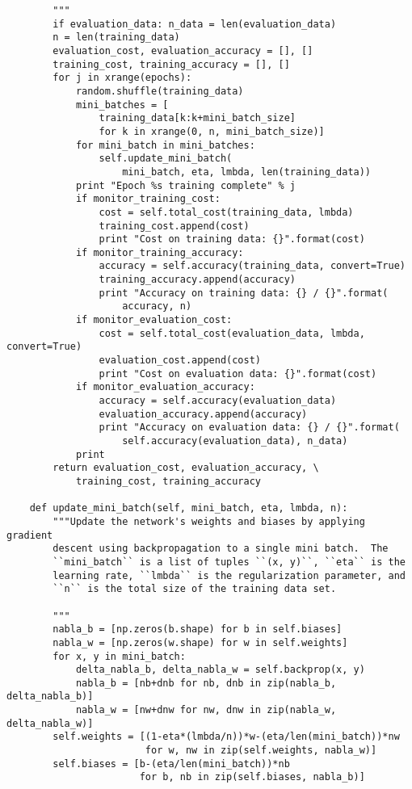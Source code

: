 \begin{lstlisting}
        """
        if evaluation_data: n_data = len(evaluation_data)
        n = len(training_data)
        evaluation_cost, evaluation_accuracy = [], []
        training_cost, training_accuracy = [], []
        for j in xrange(epochs):
            random.shuffle(training_data)
            mini_batches = [
                training_data[k:k+mini_batch_size]
                for k in xrange(0, n, mini_batch_size)]
            for mini_batch in mini_batches:
                self.update_mini_batch(
                    mini_batch, eta, lmbda, len(training_data))
            print "Epoch %s training complete" % j
            if monitor_training_cost:
                cost = self.total_cost(training_data, lmbda)
                training_cost.append(cost)
                print "Cost on training data: {}".format(cost)
            if monitor_training_accuracy:
                accuracy = self.accuracy(training_data, convert=True)
                training_accuracy.append(accuracy)
                print "Accuracy on training data: {} / {}".format(
                    accuracy, n)
            if monitor_evaluation_cost:
                cost = self.total_cost(evaluation_data, lmbda, convert=True)
                evaluation_cost.append(cost)
                print "Cost on evaluation data: {}".format(cost)
            if monitor_evaluation_accuracy:
                accuracy = self.accuracy(evaluation_data)
                evaluation_accuracy.append(accuracy)
                print "Accuracy on evaluation data: {} / {}".format(
                    self.accuracy(evaluation_data), n_data)
            print
        return evaluation_cost, evaluation_accuracy, \
            training_cost, training_accuracy

    def update_mini_batch(self, mini_batch, eta, lmbda, n):
        """Update the network's weights and biases by applying gradient
        descent using backpropagation to a single mini batch.  The
        ``mini_batch`` is a list of tuples ``(x, y)``, ``eta`` is the
        learning rate, ``lmbda`` is the regularization parameter, and
        ``n`` is the total size of the training data set.

        """
        nabla_b = [np.zeros(b.shape) for b in self.biases]
        nabla_w = [np.zeros(w.shape) for w in self.weights]
        for x, y in mini_batch:
            delta_nabla_b, delta_nabla_w = self.backprop(x, y)
            nabla_b = [nb+dnb for nb, dnb in zip(nabla_b, delta_nabla_b)]
            nabla_w = [nw+dnw for nw, dnw in zip(nabla_w, delta_nabla_w)]
        self.weights = [(1-eta*(lmbda/n))*w-(eta/len(mini_batch))*nw
                        for w, nw in zip(self.weights, nabla_w)]
        self.biases = [b-(eta/len(mini_batch))*nb
                       for b, nb in zip(self.biases, nabla_b)]


\end{lstlisting}

